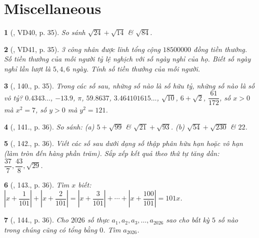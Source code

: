 \documentclass{article}
\newtheorem{baitoan}{}
\begin{document}

\section{Miscellaneous}

\begin{baitoan}[\cite{Tuyen_Toan_7}, VD40, p. 35]
	So sánh $\sqrt{24} + \sqrt{14}$ \& $\sqrt{84}$.
\end{baitoan}

\begin{baitoan}[\cite{Tuyen_Toan_7}, VD41, p. 35]
	3 công nhân được lĩnh tổng cộng $18 500 000$ đồng tiền thưởng. Số tiền thưởng của mỗi người tỷ lệ nghịch với số ngày nghỉ của họ. Biết số ngày nghỉ lần lượt là $5,4,6$ ngày. Tính số tiền thưởng của mỗi người.
\end{baitoan}

\begin{baitoan}[\cite{Tuyen_Toan_7}, 140., p. 35]
	Trong các số sau, những số nào là số hữu tỷ, những số nào là số vô tỷ? $0.4343\ldots$, $-13.9$, $\pi$, $59.8637$, $3.464101615\ldots$, $\sqrt{10}$, $6 + \sqrt{2}$, $\dfrac{61}{172}$, số $x > 0$ mà $x^2 = 7$, số $y > 0$ mà $y^2 = 121$.
\end{baitoan}

\begin{baitoan}[\cite{Tuyen_Toan_7}, 141., p. 36]
	So sánh: (a) $5 + \sqrt{99}$ \& $\sqrt{21} + \sqrt{93}$. (b) $\sqrt{54} + \sqrt{230}$ \& $22$.	
\end{baitoan}

\begin{baitoan}[\cite{Tuyen_Toan_7}, 142., p. 36]
	Viết các số sau dưới dạng số thập phân hữu hạn hoặc vô hạn (làm tròn đến hàng phần trăm). Sắp xếp kết quả theo thứ tự tăng dần: $\dfrac{37}{7},\dfrac{43}{8},\sqrt{29}$.
\end{baitoan}

\begin{baitoan}[\cite{Tuyen_Toan_7}, 143., p. 36]
	Tìm $x$ biết: $\left|x + \dfrac{1}{101}\right| + \left|x + \dfrac{2}{101}\right| = \left|x + \dfrac{3}{101}\right| + \cdots + \left|x + \dfrac{100}{101}\right| = 101x$.
\end{baitoan}

\begin{baitoan}[\cite{Tuyen_Toan_7}, 144., p. 36]
	Cho $2026$ số thực $a_1,a_2,a_3,\ldots,a_{2026}$ sao cho bất kỳ $5$ số nào trong chúng cũng có tổng bằng $0$. Tìm $a_{2026}$.
\end{baitoan}
\end{document}
